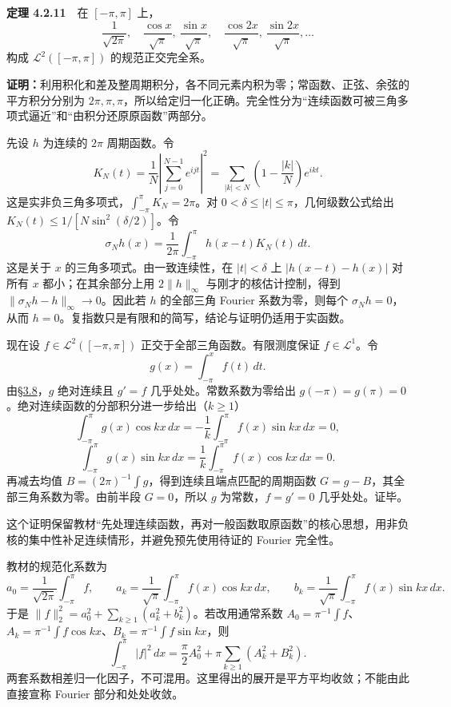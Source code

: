 \documentclass[11pt,a4paper]{article}
\begin{document}
\textbf{定理 4.2.11}　在 \([-\pi,\pi]\) 上， \[
\frac1{\sqrt{2\pi}},\quad
\frac{\cos x}{\sqrt\pi},\ \frac{\sin x}{\sqrt\pi},\quad
\frac{\cos2x}{\sqrt\pi},\ \frac{\sin2x}{\sqrt\pi},\ldots
\] 构成 \(\mathcal L^2([-\pi,\pi])\) 的规范正交完全系。

\textbf{证明：}利用积化和差及整周期积分，各不同元素内积为零；常函数、正弦、余弦的平方积分分别为
\(2\pi,\pi,\pi\)，所以给定归一化正确。完全性分为``连续函数可被三角多项式逼近''和``由积分还原原函数''两部分。

先设 \(h\) 为连续的 \(2\pi\) 周期函数。令 \[
K_N(t)=\frac1N\left|\sum_{j=0}^{N-1}e^{ijt}\right|^2
=\sum_{|k|<N}\left(1-\frac{|k|}{N}\right)e^{ikt}.
\] 这是实非负三角多项式，\(\int_{-\pi}^{\pi}K_N=2\pi\)。对
\(0<\delta\le|t|\le\pi\)，几何级数公式给出
\(K_N(t)\le1/[N\sin^2(\delta/2)]\)。令 \[
\sigma_Nh(x)=\frac1{2\pi}\int_{-\pi}^{\pi}h(x-t)K_N(t)\,dt.
\] 这是关于 \(x\) 的三角多项式。由一致连续性，在 \(|t|<\delta\) 上
\(|h(x-t)-h(x)|\) 对所有 \(x\) 都小；在其余部分上用 \(2\|h\|_\infty\)
与刚才的核估计控制，得到 \(\|\sigma_Nh-h\|_\infty\to0\)。因此若 \(h\)
的全部三角 Fourier 系数为零，则每个 \(\sigma_Nh=0\)，从而
\(h=0\)。复指数只是有限和的简写，结论与证明仍适用于实函数。

现在设 \(f\in\mathcal L^2([-\pi,\pi])\) 正交于全部三角函数。有限测度保证
\(f\in\mathcal L^1\)。令 \[
g(x)=\int_{-\pi}^{x}f(t)\,dt.
\]
由\href{https://zj139.github.io/math-notes/notes/c9fc8c834fef752831e9683d/}{§3.8}，\(g\)
绝对连续且 \(g'=f\) 几乎处处。常数系数为零给出
\(g(-\pi)=g(\pi)=0\)。绝对连续函数的分部积分进一步给出（\(k\ge1\)） \[
\int_{-\pi}^{\pi}g(x)\cos kx\,dx=-\frac1k\int_{-\pi}^{\pi}f(x)\sin kx\,dx=0,
\] \[
\int_{-\pi}^{\pi}g(x)\sin kx\,dx=\frac1k\int_{-\pi}^{\pi}f(x)\cos kx\,dx=0.
\] 再减去均值 \(B=(2\pi)^{-1}\int g\)，得到连续且端点匹配的周期函数
\(G=g-B\)，其全部三角系数为零。由前半段 \(G=0\)，所以 \(g\)
为常数，\(f=g'=0\) 几乎处处。证毕。

这个证明保留教材``先处理连续函数，再对一般函数取原函数''的核心思想，用非负核的集中性补足连续情形，并避免预先使用待证的
Fourier 完全性。

教材的规范化系数为 \[
a_0=\frac1{\sqrt{2\pi}}\int_{-\pi}^{\pi}f,\qquad
a_k=\frac1{\sqrt\pi}\int_{-\pi}^{\pi}f(x)\cos kx\,dx,\qquad
b_k=\frac1{\sqrt\pi}\int_{-\pi}^{\pi}f(x)\sin kx\,dx.
\] 于是 \(\|f\|_2^2=a_0^2+\sum_{k\ge1}(a_k^2+b_k^2)\)。若改用通常系数
\(A_0=\pi^{-1}\int f\)、\(A_k=\pi^{-1}\int f\cos kx\)、\(B_k=\pi^{-1}\int f\sin kx\)，则
\[
\int_{-\pi}^{\pi}|f|^2\,dx
=\frac\pi2A_0^2+\pi\sum_{k\ge1}(A_k^2+B_k^2).
\]
两套系数相差归一化因子，不可混用。这里得出的展开是平方平均收敛；不能由此直接宣称
Fourier 部分和处处收敛。
\end{document}
